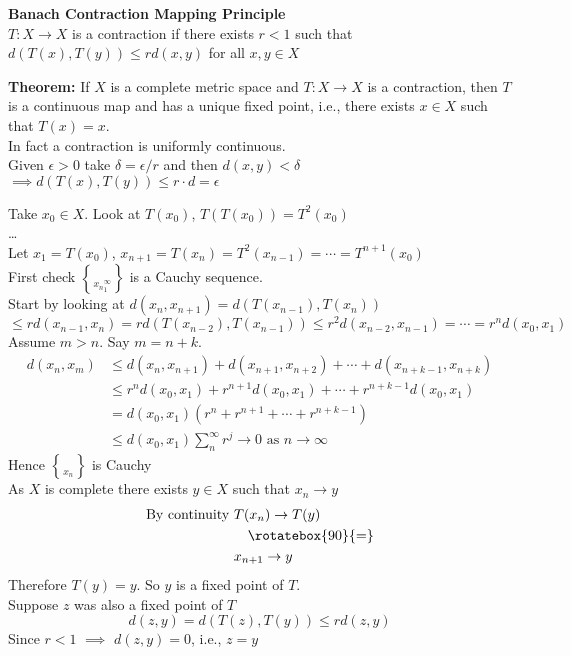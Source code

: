 \textbf{Banach Contraction Mapping Principle} \\
$T\colon X\to X$ is a contraction if there exists $r<1$ such that $d(T(x),T(y))\leq rd(x,y)$ for all $x,y\in X$

\textbf{Theorem: }If $X$ is a complete metric space and $T\colon X\to X$ is a contraction, then $T$ is a continuous map and has a unique fixed point, i.e., there exists $x\in X$ such that $T(x)=x$. \\
\pf In fact a contraction is uniformly continuous. \\
Given $\epsilon>0$ take $\delta=\epsilon/r$ and then $d(x,y)<\delta$ \\
$\implies d(T(x),T(y))\leq r\cdot d=\epsilon$

Take $x_0\in X$.  Look at $T(x_0)$, $T(T(x_0))=T^2(x_0)$ \\
\ldots \\
Let $x_1=T(x_0)$, $x_{n+1}=T(x_n)=T^2(x_{n-1})=\dotsb=T^{n+1}(x_0)$ \\
First check $\brace{x_n}_{1}^{\infty}$ is a Cauchy sequence. \\
Start by looking at $d(x_n,x_{n+1})=d(T(x_{n-1}),T(x_n))$
\[ \leq rd(x_{n-1},x_n) = rd(T(x_{n-2}),T(x_{n-1})) \leq r^2 d(x_{n-2},x_{n-1}) = \dotsb = r^n d(x_0,x_1) \]
Assume $m>n$.  Say $m=n+k$. %
\begin{align*}
d(x_n,x_m) &\leq d(x_n,x_{n+1}) + d(x_{n+1},x_{n+2}) + \dotsb + d(x_{n+k-1},x_{n+k}) \\
&\leq r^n d(x_0,x_1) + r^{n+1} d(x_0,x_1) + \dotsb + r^{n+k-1} d(x_0,x_1) \\
&= d(x_0,x_1)(r^n+r^{n+1}+\dotsb+r^{n+k-1}) \\
&\leq d(x_0,x_1)\sum_n^\infty r^j \to 0 \text{ as }n\to\infty
\end{align*}
Hence $\brace{x_n}$ is Cauchy \\
As $X$ is complete there exists $y\in X$ such that $x_n\to y$ %
\begin{align*}
\text{By continuity } & T(x_n) \to T(y) \\
& \quad\rotatebox{90}{=} \\
& x_{n+1} \to y
\end{align*}
Therefore $T(y)=y$.  So $y$ is a fixed point of $T$. \\
Suppose $z$ was also a fixed point of $T$
\[ d(z,y) = d(T(z),T(y)) \leq r d(z,y) \]
Since $r<1$ $\implies$ $d(z,y)=0$, i.e., $z=y$


